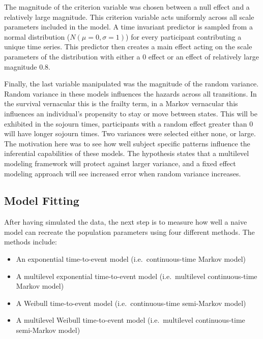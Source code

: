 \documentclass[12pt]{./styles/outhesis}
\begin{document}
The magnitude of the criterion variable was chosen between a null effect
and a relatively large magnitude. This criterion variable acts
uniformly across all scale parameters included in the model. A time
invariant predictor is sampled from a normal distribution
(\(N(\mu=0,\sigma=1)\)) for every participant contributing a unique time
series. This predictor then creates a main effect acting on the scale
parameters of the distribution with either a 0 effect or an effect of
relatively large magnitude 0.8.

Finally, the last variable manipulated was the magnitude of the random
variance. Random variance in these models influences the hazards across
all transitions. In the survival vernacular this is the frailty term, in
a Markov vernacular this influences an individual's propensity to stay
or move between states. This will be exhibited in the sojourn times,
participants with a random effect greater than 0 will have longer
sojourn times. Two variances were selected either none, or large. The
motivation here was to see how well subject specific patterns influence
the inferential capabilities of these models. The hypothesis states that
a multilevel modeling framework will protect against larger variance,
and a fixed effect modeling approach will see increased error when
random variance increases.

\subsection{Model Fitting}\label{subsec:reference_prior}
After having simulated the data, the next step is to measure how well a
naive model can recreate the population parameters using four different
methods. The methods include:

\begin{itemize}
\item
  An exponential time-to-event model (i.e.~continuous-time Markov model)
\item
  A multilevel exponential time-to-event model (i.e.~multilevel
  continuous-time Markov model)
\item
  A Weibull time-to-event model (i.e.~continuous-time semi-Markov model)
\item
  A multilevel Weibull time-to-event model (i.e.~multilevel
  continuous-time semi-Markov model)
\end{itemize}
\end{document}
